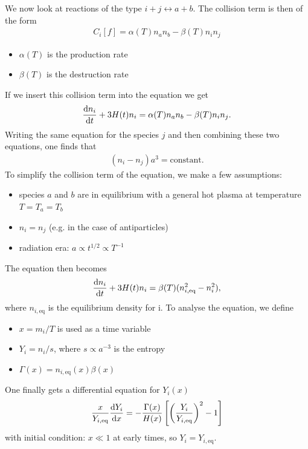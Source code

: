 We now look at reactions of the type $i + j \leftrightarrow a + b$. The collision term is then of the form
\begin{align*}
	C_i[f] = \alpha(T) n_a n_b - \beta(T) n_i n_j
\end{align*}
\begin{itemize}
	\item $\alpha(T)$ is the production rate
	\item $\beta(T)$ is the destruction rate
\end{itemize}
If we insert this collision term into the equation we get
\begin{align*}
	\dv{n_i}{t} + 3 H(t) n_i = \alpha(T) n_a n_b - \beta(T) n_i n_j. 
\end{align*}
Writing the same equation for the species $j$ and then combining these two equations, one finds that
\begin{align*}
	(n_i - n_j)a^3 = \text{constant}. 
\end{align*}
To simplify the collision term of the equation, we make a few assumptions:
\begin{itemize}
	\item species $a$ and $b$ are in equilibrium with a general hot plasma at temperature $T = T_a = T_b$
	\item $n_i = n_j$ (e.g. in the case of antiparticles)
	\item radiation era: $a \propto t^{1/2} \propto T^{-1}$
\end{itemize}
The equation then becomes
\begin{align*}
	\dv{n_i}{t} + 3 H(t) n_i = \beta(T) (n_{i, \text{eq}}^2 - n_i^2), 
\end{align*}
where $n_{i, \text{eq}}$ is the equilibrium density for i. 
To analyse the equation, we define
\begin{itemize}
	\item $x = m_i/T$ is used as a time variable
	\item $Y_i = n_i/s$, where $s \propto a^{-3}$ is the entropy
	\item $\Gamma(x) = n_{i, \text{eq}}(x) \beta(x)$
\end{itemize}
One finally gets a differential equation for $Y_i(x)$
\begin{align*}
	\frac{x}{Y_{i, \text{eq}}} \dv{Y_i}{x} = - \frac{\Gamma(x)}{H(x)} \left[ \left( \frac{Y_i}{Y_{i,\text{eq}}} \right)^2 - 1 \right]
\end{align*}
with initial condition: $x \ll 1$ at early times, so $Y_i = Y_{i, \text{eq}}$.

